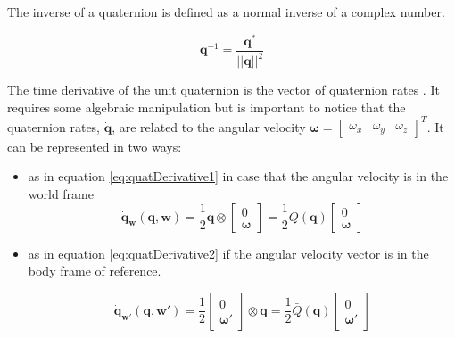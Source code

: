 \noindent The inverse of a quaternion is defined as a normal inverse of a complex number.

\begin{equation}
	\mathbf{q}^{-1} = \frac{\mathbf{q}^*}{||\mathbf{q}||^2}
	\label{eq:quatInverse}
\end{equation}

\noindent The time derivative of the unit quaternion is the vector of quaternion rates \cite{quaternion2}. It requires some algebraic manipulation but is important to notice that the quaternion rates, $\dot{\mathbf{q}}$, are related to the angular velocity $\boldsymbol{\omega} = \begin{bmatrix} \omega_x & \omega_y & \omega_z \end{bmatrix}^T$. It can be represented in two ways:

\begin{itemize}
		
	\item as in equation \eqref{eq:quatDerivative1} in case that the angular velocity is in the world frame
	\begin{equation}
		\dot{\mathbf{q}}_{\boldsymbol{w}}(\mathbf{q}, \boldsymbol{w}) = \frac{1}{2}\mathbf{q}\otimes
		\begin{bmatrix}
			0 \\
			\boldsymbol{\omega}
		\end{bmatrix}
		= \frac{1}{2}Q(\mathbf{q})
		\begin{bmatrix}
			0 \\
			\boldsymbol{\omega}
		\end{bmatrix}
		\label{eq:quatDerivative1}
	\end{equation}

	\item as in equation \eqref{eq:quatDerivative2} if the angular velocity vector is in the body frame of reference.

	\begin{equation}
		\dot{\mathbf{q}}_{\boldsymbol{w}'}(\mathbf{q}, \boldsymbol{w}') = \frac{1}{2}
		\begin{bmatrix}
			0 \\
			\boldsymbol{\omega}'
		\end{bmatrix}
		\otimes \mathbf{q} = \frac{1}{2}\bar{Q}(\mathbf{q})
		\begin{bmatrix}
			0 \\
			\boldsymbol{\omega}'
		\end{bmatrix}
		\label{eq:quatDerivative2}
	\end{equation}
\end{itemize}

